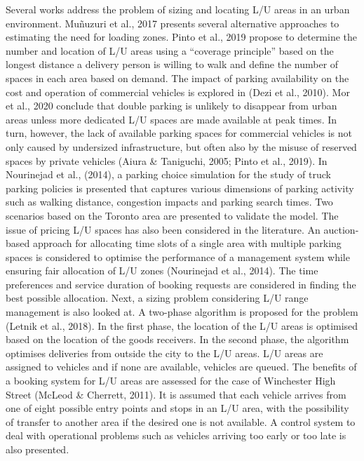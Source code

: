 \documentclass[
]{book}
\begin{document}
Several works address the problem of sizing and locating L/U areas in an urban environment. Muñuzuri et al., 2017 presents several alternative approaches to estimating the need for loading zones. Pinto et al., 2019 propose to determine the number and location of L/U areas using a ``coverage principle'' based on the longest distance a delivery person is willing to walk and define the number of spaces in each area based on demand. The impact of parking availability on the cost and operation of commercial vehicles is explored in (Dezi et al., 2010).
Mor et al., 2020 conclude that double parking is unlikely to disappear from urban areas unless more dedicated L/U spaces are made available at peak times. In turn, however, the lack of available parking spaces for commercial vehicles is not only caused by undersized infrastructure, but often also by the misuse of reserved spaces by private vehicles (Aiura \& Taniguchi, 2005; Pinto et al., 2019).
In Nourinejad et al., (2014), a parking choice simulation for the study of truck parking policies is presented that captures various dimensions of parking activity such as walking distance, congestion impacts and parking search times. Two scenarios based on the Toronto area are presented to validate the model.
The issue of pricing L/U spaces has also been considered in the literature. An auction-based approach for allocating time slots of a single area with multiple parking spaces is considered to optimise the performance of a management system while ensuring fair allocation of L/U zones (Nourinejad et al., 2014). The time preferences and service duration of booking requests are considered in finding the best possible allocation.
Next, a sizing problem considering L/U range management is also looked at. A two-phase algorithm is proposed for the problem (Letnik et al., 2018). In the first phase, the location of the L/U areas is optimised based on the location of the goods receivers. In the second phase, the algorithm optimises deliveries from outside the city to the L/U areas. L/U areas are assigned to vehicles and if none are available, vehicles are queued. The benefits of a booking system for L/U areas are assessed for the case of Winchester High Street (McLeod \& Cherrett, 2011). It is assumed that each vehicle arrives from one of eight possible entry points and stops in an L/U area, with the possibility of transfer to another area if the desired one is not available. A control system to deal with operational problems such as vehicles arriving too early or too late is also presented.
\end{document}
